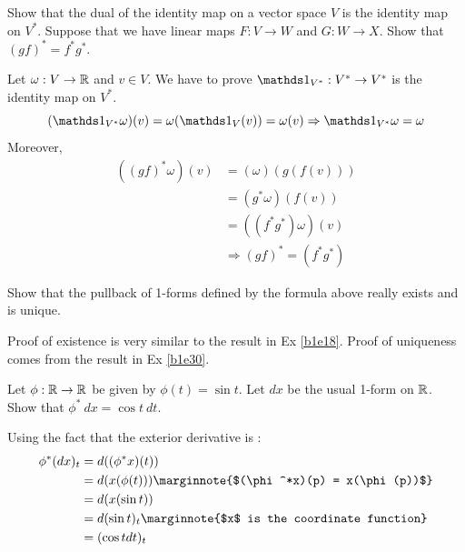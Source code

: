 \documentclass[10pt]{article}
\begin{document}
\begin{example}\label{b1e31}
	Show that the dual of the identity map on a vector space $V$ is the identity map on $V^*$. Suppose that we have linear maps $F:V\to W$ and $G:W\to X$. Show that $(gf)^* = f^*g^*$.
\end{example}
\sol Let $\omega: V \to \mathbb{R}$ and $v \in V$. We have to prove $\id_{V^*}:V^*\to V^*$ is the identity map on $V^*$. 
$$
	(\id_{V^*}\omega)(v) = \omega(\id_V(v)) = \omega(v) \Rightarrow \id_{V^*}\omega = \omega
$$
Moreover,
$$
\begin{aligned}
	((gf)^*\omega)(v) &= (\omega)(g(f(v)))\\
	&= (g^*\omega)(f(v))\\
	&= ((f^*g^*)\omega)(v)\\
	& \Rightarrow (gf)^* = (f^*g^*)
\end{aligned}
$$

\begin{example}
	Show that the pullback of 1-forms defined by the formula above really exists and is unique.
\end{example}
\sol Proof of existence is very similar to the result in Ex \ref{b1e18}.
Proof of uniqueness comes from the result in Ex \ref{b1e30}.


\begin{example}
	Let $\phi:\mathbb{R}\to\mathbb{R}$ be given by $\phi(t)=\sin t$. Let $dx$ be the usual 1-form on $\mathbb{R}$. Show that $\phi^*\:dx = \cos t\:dt$.
\end{example}
\sol Using the fact that the exterior derivative is :
$$
\begin{aligned}
	\phi^*(dx)_t &= d((\phi^*x)(t))\\
	&= d(x(\phi(t)))\marginnote{$(\phi^*x)(p) = x(\phi(p))$}\\
	&= d(x(\sin t))\\
	&= d(\sin t)_t\marginnote{$x$ is the coordinate function}\\
	&= (\cos t dt)_t\\
\end{aligned}
$$
\end{document}
